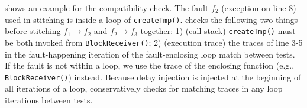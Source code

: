  shows 
an example for the compatibility check. 
The fault $f_2$ (exception on line 8) used in stitching 
is inside a loop of \texttt{createTmp()}.  
\tool checks the following two things before stitching $f_1 \rightarrow f_2$ and $f_2 \rightarrow f_3$ together: 
1) (call stack) \texttt{create\-Tmp()} must be both invoked from \texttt{Block\-Re\-ceiver()}; 
2) (execution trace) 
the traces of line 3-5 
in the 
fault-happening 
iteration 
of the fault-enclosing loop match between tests. 
If the fault is not within a loop, 
we use the trace of the enclosing function (e.g., \texttt{Block\-Re\-ceiver()}) instead. 
Because delay injection is injected at the beginning of all iterations of a loop, 
\tool conservatively checks 
for matching traces in any loop iterations between tests. 

